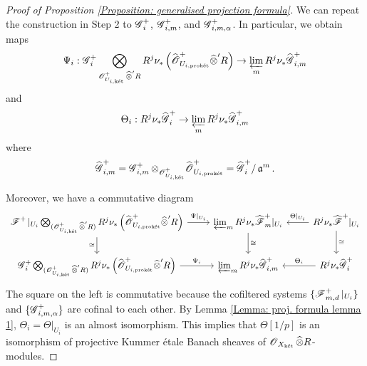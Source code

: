 \begin{proof}[Proof of Proposition \ref{Proposition: generalised projection formula}]
We can repeat the construction in Step 2 to $\operatorname{\mathscr{G}}^+_i$, $\operatorname{\mathscr{G}}^+_{i,m}$, and $\operatorname{\mathscr{G}}^+_{i,m,\alpha}$. In particular, we obtain maps
$$ \Psi_i: \operatorname{\mathscr{G}}^+_i \bigotimes_{\operatorname{\mathscr{O}}_{U_{i,\operatorname{\textrm{k\'{e}t}}}}^+ \widehat{\otimes}' R} R^j\nu_*\left(\widehat{\operatorname{\mathscr{O}}}_{U_{i,\operatorname{\textrm{prok\'{e}t}}}}^+\widehat{\otimes}' R\right) \rightarrow \varprojlim_{m} R^j\nu_*\widehat{\operatorname{\mathscr{G}}}_{i,m}^+$$
and
$$\Theta_i: R^j\nu_*\widehat{\operatorname{\mathscr{G}}}^+_i \rightarrow \varprojlim_{m}R^j\nu_{*}\widehat{\operatorname{\mathscr{G}}}_{i,m}^+$$
where $$\widehat{\operatorname{\mathscr{G}}}^+_{i,m}=\operatorname{\mathscr{G}}^+_{i,m}\otimes_{\operatorname{\mathscr{O}}^+_{U_{i,\operatorname{\textrm{k\'{e}t}}}}}\widehat{\operatorname{\mathscr{O}}}^+_{U_{i,\operatorname{\textrm{prok\'{e}t}}}}=\widehat{\operatorname{\mathscr{G}}}^+_i/\operatorname{\mathfrak{a}}^m.$$

Moreover, we have a commutative diagram
$$ \begin{tikzcd}
        \scrF^+|_{U_i} \bigotimes_{(\scrO^+_{U_{i, \ket}}\widehat{\otimes}' R)}R^j\nu_*\left(\widehat{\scrO}_{U_{i, \proket}}^+\widehat{\otimes}' R\right)\arrow[r, "\Psi|_{U_i}"]\arrow[d, "\cong "'] & \varprojlim_{m} R^j\nu_* \widehat{\scrF}_m^+|_{U_i}\arrow[d, "\cong"] & R^j\nu_*\widehat{\scrF}^+|_{U_i} \arrow[l, "\Theta|_{U_i}"']\arrow[d, "\cong"]\\
        \scrG_{i}^+ \bigotimes_{(\scrO^+_{U_{i, \ket}}\widehat{\otimes}' R)}R^j\nu_*\left(\widehat{\scrO}_{U_{i, \proket}}^+\widehat{\otimes}' R\right)\arrow[r, "\Psi_i"] & \varprojlim_{m} R^j\nu_* \widehat{\scrG}_{i,m}^+ & R^j\nu_*\widehat{\scrG}_i^+\arrow[l, "\Theta_i"']
    \end{tikzcd}
    $$
   The square on the left is commutative because the cofiltered systems $\{\operatorname{\mathscr{F}}^+_{m,d}|_{U_i}\}$ and $\{\operatorname{\mathscr{G}}^+_{i,m,\alpha}\}$ are cofinal to each other. By Lemma \ref{Lemma: proj. formula lemma 1}, $\Theta_i=\Theta|_{U_i}$ is an almost isomorphism. This implies that $\Theta[1/p]$ is an isomorphism of projective Kummer \'etale Banach sheaves of $\operatorname{\mathscr{O}}_{X_{\operatorname{\textrm{k\'{e}t}}}}\widehat{\otimes}R$-modules.


\end{proof}
